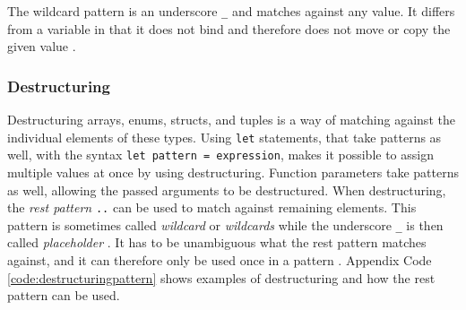 The wildcard pattern is an underscore \texttt{\_} and matches against any value. It differs from a variable in that it does not bind and therefore does not move or copy the given value \cite[Chapter~6.2, Chapter~18.3]{rustbook}.


\subsubsection{Destructuring}
Destructuring arrays, enums, structs, and tuples is a way of matching against the individual elements of these types.
Using \texttt{let} statements, that take patterns as well, with the syntax \texttt{let pattern = expression}, makes it possible to assign multiple values at once by using destructuring.
Function parameters take patterns as well, allowing the passed arguments to be destructured.
When destructuring, the \textit{rest pattern} \texttt{..} can be used to match against remaining elements. This pattern is sometimes called \textit{wildcard} or \textit{wildcards} while the underscore \texttt{\_} is then called \textit{placeholder} \cite{oldrustrefmatchexpr}.
It has to be unambiguous what the rest pattern matches against, and it can therefore only be used once in a pattern \cite[243-244]{Blandy_Jim2021-07-20} \cite[Chapter~18.3]{rustbook} \cite[Chapter~9]{rustref}.
Appendix Code \ref{code:destructuringpattern} shows examples of destructuring and how the rest pattern can be used.


\enlargethispage{2\baselineskip}
